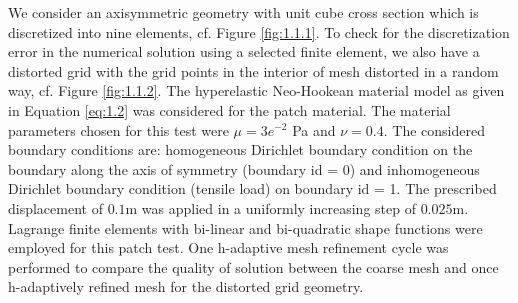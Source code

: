\documentclass[11pt,a4paper,final]{article}
\begin{document}
We consider an axisymmetric geometry with unit cube cross section which is discretized into nine elements, cf. Figure \eqref{fig:1.1.1}. To check for the discretization error in the numerical solution using a selected finite element, we also have a distorted grid with the grid points in the interior of mesh distorted in a random way, cf. Figure \eqref{fig:1.1.2}. The hyperelastic Neo-Hookean material model as given in Equation \eqref{eq:1.2} was considered for the patch material. The material parameters chosen for this test were $\mu = 3e^{-2}$ Pa and $\nu = 0.4$. The considered boundary conditions are: homogeneous Dirichlet boundary condition on the boundary along the axis of symmetry (boundary id = 0) and inhomogeneous Dirichlet boundary condition (tensile load) on boundary id = 1. The prescribed displacement of $0.1 $m was applied in a uniformly increasing step of $0.025 $m. Lagrange finite elements with bi-linear and bi-quadratic shape functions were employed for this patch test. One h-adaptive mesh refinement cycle was performed to compare the quality of solution between the coarse mesh and once h-adaptively refined mesh for the distorted grid geometry. \par 
\end{document}
